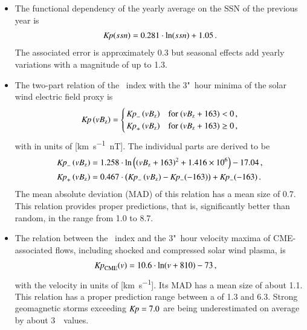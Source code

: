 \begin{itemize}
	\item The functional dependency of the yearly \Kp{} average on the SSN of the previous year is
	\begin{align*}
		\textit{Kp}(ssn) = 0.281 \cdot \ln(ssn) + 1.05	\,.
	\end{align*}
	The associated \Kp{} error is approximately \num{0.3} but seasonal effects add yearly variations with a \Kp{} magnitude of up to 1.3.

	\item The two-part relation of the \Kp~index with the 3"~hour minima of the solar wind electric field proxy \vBz{} is
	\begin{align*}
		\text{\textit{Kp}}\left(vB_\text{z}\right) =
		\begin{cases}
			\,\text{\textit{Kp}}_-\left(vB_\text{z}\right) &\text{for~} (vB_\text{z} + 163) < 0	\,,\\
			\,\text{\textit{Kp}}_+\left(vB_\text{z}\right) &\text{for~} (vB_\text{z} + 163) \ge 0	\,,
		\end{cases}
	\end{align*}
	with \vBz{} in units of [\si{\km\per\s \nano\tesla}]. The individual parts are derived to be
	\begin{align*}
		\text{\textit{Kp}}_-\left(vB_\text{z}\right) &= 1.258 \cdot \ln\left(\left(vB_\text{z} + 163\right)^2 + \num{1.416e6}\right) - 17.04	\,,\\
		\text{\textit{Kp}}_+\left(vB_\text{z}\right) &= 0.467 \cdot \left(\text{\textit{Kp}}_-\left(vB_\text{z}\right) - \text{\textit{Kp}}_-(-163)\right) + \text{\textit{Kp}}_-(-163)	\,.
	\end{align*}
	The mean absolute deviation (MAD) of this relation has a mean \Kp{} size of \num{0.7}. This relation provides proper predictions, that is, significantly better than random, in the \Kp{} range from \num{1.0} to \num{8.7}.

	\item The relation between the \Kp~index and the 3"~hour velocity maxima of CME-associated flows, including shocked and compressed solar wind plasma, is
	\begin{align*}
		\text{\textit{Kp}}_\text{CME}(v) &= 10.6 \cdot \ln(v + 810) - 73	\,,
	\end{align*}
	with the velocity in units of [\si{\km\per\s}]. Its MAD has a mean \Kp{} size of about \num{1.1}. This relation has a proper prediction range between a \Kp{} of \num{1.3} and \num{6.3}. Strong geomagnetic storms exceeding $\text{\textit{Kp}} = 7.0$ are being underestimated on average by about 3~\Kp~values.


\end{itemize}
